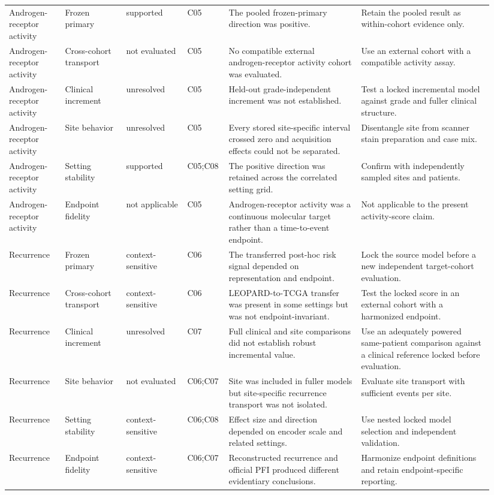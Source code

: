\begin{landscape}
\begin{longtable}{@{}p{0.11\linewidth}p{0.12\linewidth}p{0.12\linewidth}p{0.07\linewidth}p{0.26\linewidth}p{0.26\linewidth}@{}}
Androgen-receptor activity & Frozen primary & supported & C05 & The pooled frozen-primary direction was positive. & Retain the pooled result as within-cohort evidence only. \\
Androgen-receptor activity & Cross-cohort transport & not evaluated & C05 & No compatible external androgen-receptor activity cohort was evaluated. & Use an external cohort with a compatible activity assay. \\
Androgen-receptor activity & Clinical increment & unresolved & C05 & Held-out grade-independent increment was not established. & Test a locked incremental model against grade and fuller clinical structure. \\
Androgen-receptor activity & Site behavior & unresolved & C05 & Every stored site-specific interval crossed zero and acquisition effects could not be separated. & Disentangle site from scanner stain preparation and case mix. \\
Androgen-receptor activity & Setting stability & supported & C05;C08 & The positive direction was retained across the correlated setting grid. & Confirm with independently sampled sites and patients. \\
Androgen-receptor activity & Endpoint fidelity & not applicable & C05 & Androgen-receptor activity was a continuous molecular target rather than a time-to-event endpoint. & Not applicable to the present activity-score claim. \\
Recurrence & Frozen primary & context-sensitive & C06 & The transferred post-hoc risk signal depended on representation and endpoint. & Lock the source model before a new independent target-cohort evaluation. \\
Recurrence & Cross-cohort transport & context-sensitive & C06 & LEOPARD-to-TCGA transfer was present in some settings but was not endpoint-invariant. & Test the locked score in an external cohort with a harmonized endpoint. \\
Recurrence & Clinical increment & unresolved & C07 & Full clinical and site comparisons did not establish robust incremental value. & Use an adequately powered same-patient comparison against a clinical reference locked before evaluation. \\
Recurrence & Site behavior & not evaluated & C06;C07 & Site was included in fuller models but site-specific recurrence transport was not isolated. & Evaluate site transport with sufficient events per site. \\
Recurrence & Setting stability & context-sensitive & C06;C08 & Effect size and direction depended on encoder scale and related settings. & Use nested locked model selection and independent validation. \\
Recurrence & Endpoint fidelity & context-sensitive & C06;C07 & Reconstructed recurrence and official PFI produced different evidentiary conclusions. & Harmonize endpoint definitions and retain endpoint-specific reporting. \\
\bottomrule
\end{longtable}
\endgroup
\end{landscape}
